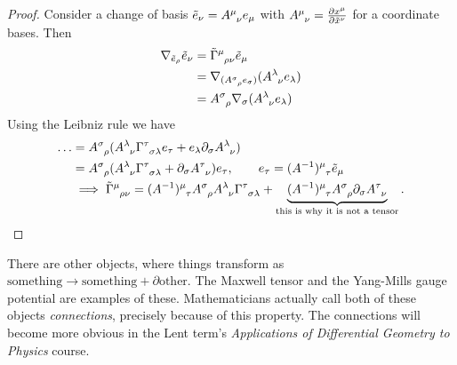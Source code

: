 \begin{proof}
  Consider a change of basis $\tilde e_\nu = A \indices{^\mu_\nu} e_\mu$ with $A \indices{^\mu_\nu} = \pdv{x^\mu}{\tilde x^\nu}$ for a coordinate bases.
  Then 
  \begin{align}
    \nabla_{\tilde e_\rho} \tilde e_\nu &= \tilde \Gamma \indices{^\mu_\rho_\nu} \tilde e_\mu \\
					&= \nabla_{(A \indices{^\sigma_\rho} e_\sigma)} (A \indices{^\lambda_\nu} e_\lambda) \\
					&= A \indices{^\sigma_\rho} \nabla_\sigma (A \indices{^\lambda_\nu} e_\lambda)
  \end{align}
  Using the Leibniz rule we have
  \begin{align}
    \dots &= A \indices{^\sigma_\rho} (A \indices{^\lambda_\nu} \Gamma \indices{^\tau_\sigma_\lambda} e_\tau + e_\lambda \partial_\sigma A \indices{^\lambda_\nu}) \\
	  &= A \indices{^\sigma_\rho} (A \indices{^\lambda _\nu} \Gamma \indices{^\tau_\sigma_\lambda} + \partial_\sigma A \indices{^\tau_\nu}) e_\tau, \qquad e_\tau = (A^{-1}) \indices{^\mu_\tau} \tilde e_\mu\\
	  &\implies \tilde\Gamma \indices{^\mu_\rho_\nu} = (A^{-1}) \indices{^\mu_\tau} A \indices{^\sigma_\rho} A \indices{^\lambda_\nu} \Gamma \indices{^\tau_\sigma_\lambda} + \underbrace{(A^{-1}) \indices{^\mu_\tau} A \indices{^\sigma_\rho} \partial_\sigma A \indices{^\tau_\nu}}_{\text{this is why it is not a tensor}}.
  \end{align}
\end{proof}
\begin{leftbar}
  \begin{remark}
    There are other objects, where things transform as $\text{something} \to \text{something} + \partial\text{other}$. The Maxwell tensor and the Yang-Mills gauge potential are examples of these. 
    Mathematicians actually call both of these objects \emph{connections}, precisely because of this property. The connections will become more obvious in the Lent term's \emph{Applications of Differential Geometry to Physics} course.
  \end{remark}
\end{leftbar}

